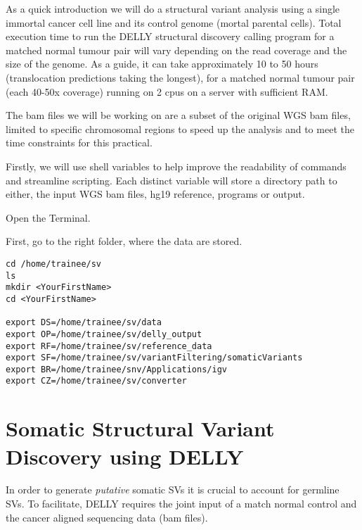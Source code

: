 \begin{note}
As a quick introduction we will do a structural variant analysis using a single immortal cancer cell line and its control genome (mortal parental cells). Total execution time to run the DELLY structural discovery calling program for a matched normal tumour pair will vary depending on the read coverage and the size of the genome. As a guide, it can take approximately 10 to 50 hours (translocation predictions taking the longest), for a matched normal tumour pair (each 40-50x coverage) running on 2 cpus on a server with sufficient RAM.

The bam files we will be working on are a subset of the original WGS bam files, limited to specific chromosomal regions to speed up the analysis and to meet the time constraints for this practical. 
\end{note}

\begin{information}
Firstly, we will use shell variables to help improve the readability of commands and streamline scripting. Each distinct variable will store a directory path to either, the input WGS bam files, hg19 reference, programs or output.

\end{information}

\begin{steps}
Open the Terminal.

First, go to the right folder, where the data are stored.
\begin{lstlisting}
cd /home/trainee/sv
ls
mkdir <YourFirstName>
cd <YourFirstName>

export DS=/home/trainee/sv/data
export OP=/home/trainee/sv/delly_output
export RF=/home/trainee/sv/reference_data
export SF=/home/trainee/sv/variantFiltering/somaticVariants
export BR=/home/trainee/snv/Applications/igv
export CZ=/home/trainee/sv/converter

\end{lstlisting}

\end{steps}

\section{Somatic Structural Variant Discovery using DELLY}

\begin{information}
In order to generate \emph{putative} somatic SVs it is crucial to account for germline SVs. To facilitate, DELLY requires the joint input of a match normal control and the cancer aligned sequencing data (bam files).
\end{information}

